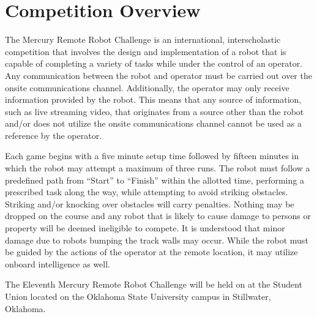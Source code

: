 \section{Competition Overview}
The Mercury Remote Robot Challenge is an international, interscholastic competition that involves the design and implementation of a robot that is capable of completing a variety of tasks while under the control of an operator. Any communication between the robot and operator must be carried out over the onsite communications channel. Additionally, the operator may only receive information provided by the robot. This means that any source of information, such as live streaming video, that originates from a source other than the robot and/or does not utilize the onsite communications channel cannot be used as a reference by the operator.

Each game begins with a five minute setup time followed by fifteen minutes in which the robot may attempt a maximum of three runs. The robot must follow a predefined path from “Start” to “Finish” within the allotted time, performing a prescribed task along the way, while attempting to avoid striking obstacles. Striking and/or knocking over obstacles will carry penalties. Nothing may be dropped on the course and any robot that is likely to cause damage to persons or property will be deemed ineligible to compete. It is understood that minor damage due to robots bumping the track walls may occur. While the robot must be guided by the actions of the operator at the remote location, it may utilize onboard intelligence as well.

The Eleventh Mercury Remote Robot Challenge will be held on \textbf{\competition} at the Student Union located on the Oklahoma State University campus in Stillwater, Oklahoma.